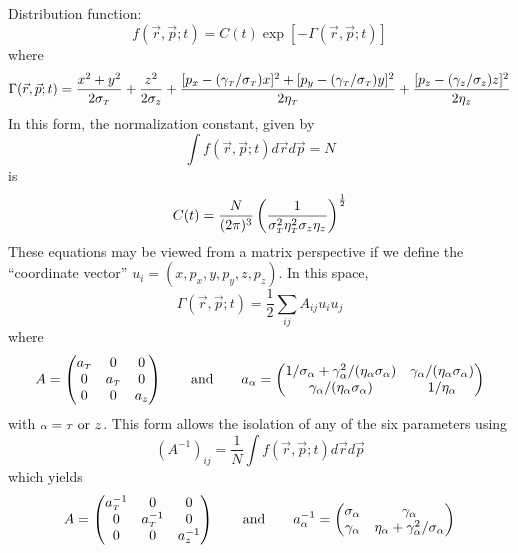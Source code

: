 Distribution function:
\begin{equation}
  f(\vec{r}, \vec{p}; t) = C(t)\exp \left[ - \Gamma(\vec{r}, \vec{p}; t) \right]
\end{equation}
where
\begin{equation}
  \Gamma(\vec{r}, \vec{p}; t) =
  \frac{x^2 + y^2}{2 \sigma_{{\scriptscriptstyle T}}} + \frac{z^2}{2 \sigma_{z}}
  + \frac{
    [p_x - (\gamma_{{\scriptscriptstyle T}}/\sigma_{{\scriptscriptstyle T}}) x ]^2 
    + [p_y - (\gamma_{{\scriptscriptstyle T}}/\sigma_{{\scriptscriptstyle T}}) y ]^2
  }{2 \eta_{{\scriptscriptstyle T}}}
  + \frac{ [p_z - (\gamma_{z}/\sigma_{z}) z ]^2 }{2 \eta_{z}}
\end{equation}
In this form, the normalization constant, given by
\begin{equation}
  \int f(\vec{r}, \vec{p}; t) d\vec{r} d\vec{p} = N
\end{equation}
is
\begin{equation}
  C(t) = \frac{N}{(2\pi)^3} 
  \left( 
    \frac{1}{\sigma_{{\scriptscriptstyle T}}^2\eta_{{\scriptscriptstyle T}}^2\sigma_{z}\eta_{z}}
  \right)^{\frac{1}{2}}
\end{equation}
These equations may be viewed from a matrix perspective if we define the ``coordinate vector'' $u_i = (x, p_x, y, p_y, z, p_z)$. In this space,
\begin{equation}
  \Gamma(\vec{r}, \vec{p}; t) = \frac{1}{2}\sum\limits_{ij} A_{ij} u_i u_j
\end{equation}
where
\begin{equation}
  A = 
  \begin{pmatrix}
    a_{{\scriptscriptstyle T}} & 0 & 0 \\
    0 & a_{{\scriptscriptstyle T}} & 0 \\
    0 & 0 & a_{z}
  \end{pmatrix}
  \qquad \text{and} \qquad
  a_{\alpha} = 
  \begin{pmatrix}
    1/\sigma_{\alpha} + \gamma_{\alpha}^2/(\eta_{\alpha} \sigma_{\alpha}) & \gamma_{\alpha}/(\eta_{\alpha} \sigma_{\alpha}) \\
    \gamma_{\alpha}/(\eta_{\alpha} \sigma_{\alpha}) & 1/\eta_{\alpha}
  \end{pmatrix}
\end{equation}
with ${\scriptstyle \alpha} = {\scriptscriptstyle T} \text{ or } z$. This form allows the isolation of any of the six parameters using
\begin{equation}
  (A^{-1})_{ij} = \frac{1}{N} \int f(\vec{r}, \vec{p}; t) d\vec{r} d\vec{p}
\end{equation}
which yields
\begin{equation}
  A = 
  \begin{pmatrix}
    a_{{\scriptscriptstyle T}}^{-1} & 0 & 0 \\
    0 & a_{{\scriptscriptstyle T}}^{-1} & 0 \\
    0 & 0 & a_{z}^{-1}
  \end{pmatrix}
  \qquad \text{and} \qquad
  a^{-1}_{\alpha} = 
  \begin{pmatrix}
    \sigma_{\alpha} & \gamma_{\alpha} \\
    \gamma_{\alpha} & \eta_{\alpha} + \gamma_{\alpha}^2/\sigma_{\alpha}
  \end{pmatrix}
\end{equation}
